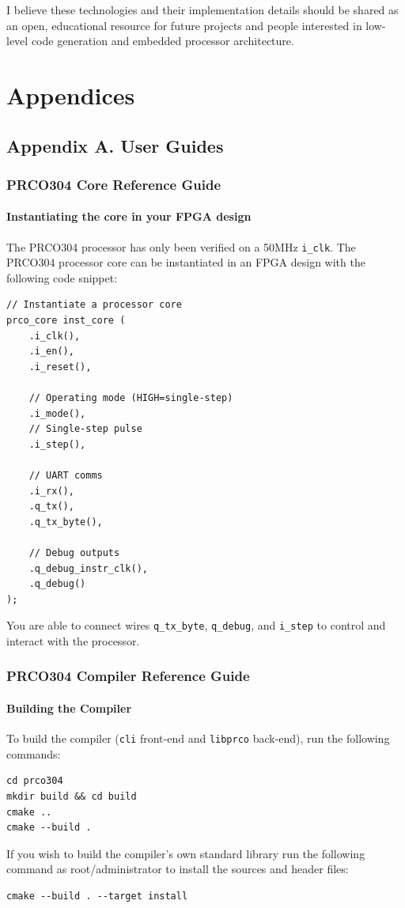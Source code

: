 \documentclass[11pt,a4paper]{report}
\newcommand{\scname}{PRCO304}
\begin{document}
I believe these technologies and their implementation details should be shared as an open, educational resource for future projects and people interested in low-level code generation and embedded processor architecture.






\newpage



\newpage
\chapter{Appendices}
\linespread{1.0}
{\hypersetup{linkcolor=black}
\startcontents[chapters]
}

\newpage
\section{Appendix A. User Guides}
\subsection{\scname{} Core Reference Guide}
\subsubsection*{Instantiating the core in your FPGA design}
The \scname{} processor has only been verified on a 50MHz \verb|i_clk|. 
The \scname{} processor core can be instantiated in an FPGA design with the following code snippet:
\begin{verbatim}
// Instantiate a processor core
prco_core inst_core (
    .i_clk(), 
    .i_en(), 
    .i_reset(),
    
    // Operating mode (HIGH=single-step)
    .i_mode(),
    // Single-step pulse
    .i_step(),
    
    // UART comms
    .i_rx(),
    .q_tx(),
    .q_tx_byte(),
    
    // Debug outputs
    .q_debug_instr_clk(),
    .q_debug()
);
\end{verbatim}
You are able to connect wires \verb|q_tx_byte|, \verb|q_debug|, and \verb|i_step| to control and interact with the processor.

\newpage
\subsection{\scname{} Compiler Reference Guide}
\subsubsection*{Building the Compiler}
To build the compiler (\verb|cli| front-end and \verb|libprco| back-end), run the following commands:
\begin{verbatim}
cd prco304
mkdir build && cd build
cmake ..
cmake --build .
\end{verbatim}
If you wish to build the compiler's own standard library run the following command as root/administrator to install the sources and header files:
\begin{verbatim}
cmake --build . --target install
\end{verbatim}
\end{document}

